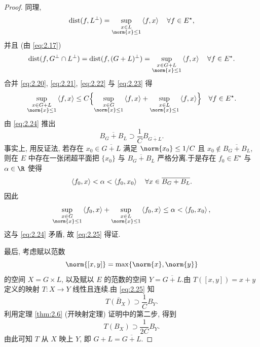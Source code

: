 \begin{proof}
同理,
\begin{equation}
\dist(f,L^\perp)=\sup_{\substack{x\in L\\ \norm{x}\le1}}\dual{f}{x}
\quad \forall f\in E^\star,
\label{eq:2.22}
\end{equation}
并且 (由 \eqref{eq:2.17})
\begin{equation}
\dist(f,G^\perp\cap L^\perp)=\dist(f,(G+L)^\perp)
=\sup_{\substack{x\in G+L\\ \norm{x}\le1}}\dual{f}{x}\quad \forall f\in E^\star.
\label{eq:2.23}
\end{equation}
合并 \eqref{eq:2.20}, \eqref{eq:2.21}, \eqref{eq:2.22} 与 \eqref{eq:2.23} 得
\begin{equation}
\sup_{\substack{x\in G+L\\ \norm{x}\le1}}\dual{f}{x}
\le C\Bigl\{\sup_{\substack{x\in G\\ \norm{x}\le1}}\dual{f}{x}
+\sup_{\substack{x\in L\\ \norm{x}\le1}}\dual{f}{x}\Bigr\}
\quad \forall f\in E^\star.
\label{eq:2.24}
\end{equation}
由 \eqref{eq:2.24} 推出
\begin{equation}
\overline{B_G+B_L}\supset\frac{1}{C}B_{\overline{G+L}}.
\label{eq:2.25}
\end{equation}
事实上, 用反证法, 若存在 $x_0\in\overline{G+L}$ 满足 $\norm{x_0}\le1/C$ 且
$x_0\notin\overline{B_G+B_L}$, 则在 $E$ 中存在一张闭超平面把 $\{x_0\}$ 与
$\overline{B_G+B_L}$ 严格分离.于是存在 $f_0\in E^\star$ 与 $\alpha\in\R$ 使得
\begin{equation*}
\left\langle f_0,x\right\rangle<\alpha<\left\langle f_0,x_0\right\rangle\quad \forall x\in\overline{B_G+B_L}.
\end{equation*}
因此
\begin{equation*}
\sup_{\substack{x\in G\\ \norm{x}\le1}}\dual{f_0}{x}
+\sup_{\substack{x\in L\\ \norm{x}\le1}}\dual{f_0}{x}
\le\alpha<\dual{f_0}{x_0},
\end{equation*}
这与 \eqref{eq:2.24} 矛盾, 故 \eqref{eq:2.25} 得证.

最后, 考虑赋以范数
\begin{equation*}
\norm{[x,y]}=\max\{\norm{x},\norm{y}\}
\end{equation*}
的空间 $X=G\times L$, 以及赋以 $E$ 的范数的空间 $Y=\overline{G+L}$.由
$T([x,y])=x+y$ 定义的映射 $T:X\to Y$ 线性且连续.由 \eqref{eq:2.25} 知
\begin{equation*}
\overline{T(B_X)}\supset\frac{1}{C}B_Y.
\end{equation*}
利用定理  \ref{thm:2.6} (开映射定理) 证明中的第二步, 得到
\begin{equation*}
T(B_X)\supset\frac{1}{2C}B_Y.
\end{equation*}
由此可知 $T$ 从 $X$ 映上 $Y$, 即 $G+L=\overline{G+L}$.
\end{proof}

